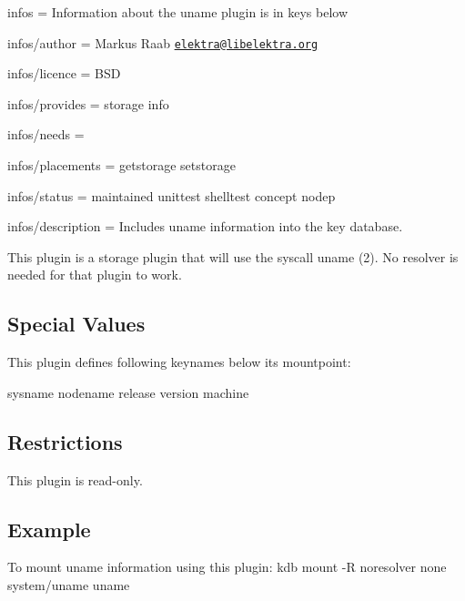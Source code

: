 
\begin{DoxyItemize}
\item infos = Information about the uname plugin is in keys below
\item infos/author = Markus Raab \href{mailto:elektra@libelektra.org}{\tt elektra@libelektra.\+org}
\item infos/licence = B\+S\+D
\item infos/provides = storage info
\item infos/needs =
\item infos/placements = getstorage setstorage
\item infos/status = maintained unittest shelltest concept nodep
\item infos/description = Includes uname information into the key database.
\end{DoxyItemize}

This plugin is a storage plugin that will use the syscall {\ttfamily uname (2)}. No resolver is needed for that plugin to work.

\subsection*{Special Values}

This plugin defines following keynames below its mountpoint\+: \begin{DoxyVerb}    sysname
    nodename
    release
    version
    machine
\end{DoxyVerb}


\subsection*{Restrictions}

This plugin is read-\/only.

\subsection*{Example}

To mount uname information using this plugin\+: {\ttfamily kdb mount -\/\+R noresolver none system/uname uname} 